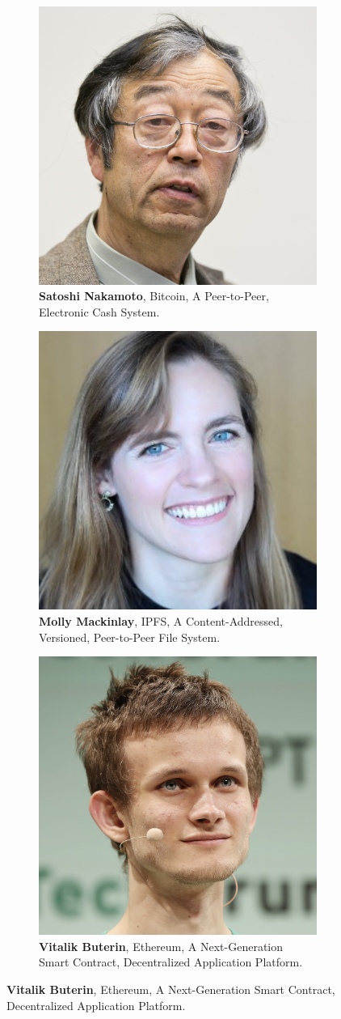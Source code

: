 \documentclass[a4paper,12pt]{article}
\begin{document}
\begin{figure}
  \centering
  \begin{subfigure}[t]{.3\linewidth}
    \centering\includegraphics[width=.5\linewidth]{img/satoshi}
    \caption{\textbf{Satoshi Nakamoto}, Bitcoin, A Peer-to-Peer, Electronic Cash System.}
  \end{subfigure}
  \begin{subfigure}[t]{.3\linewidth}
    \centering\includegraphics[width=.5\linewidth]{img/molly}
    \caption{\textbf{Molly Mackinlay}, IPFS, A Content-Addressed, Versioned, Peer-to-Peer File System.}
  \end{subfigure}
  \begin{subfigure}[t]{.3\linewidth}
    \centering\includegraphics[width=.5\linewidth]{img/vitalik}
    \caption{\textbf{Vitalik Buterin}, Ethereum, A Next-Generation Smart Contract, Decentralized Application Platform.}
  \end{subfigure}


\end{figure}
\end{document}

